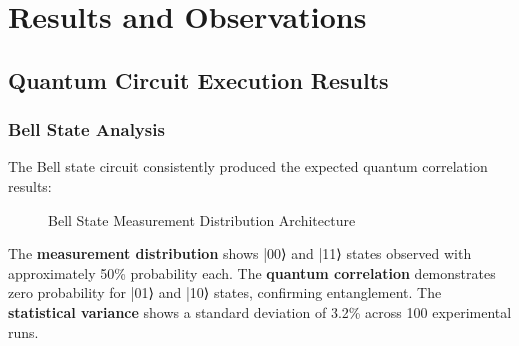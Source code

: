 \documentclass[onecolumn]{IEEEtran}
\begin{document}
\section{Results and Observations}

\subsection{Quantum Circuit Execution Results}

\subsubsection{Bell State Analysis}

The Bell state circuit consistently produced the expected quantum correlation results:

\begin{figure}[h]
\centering
{}
\caption{Bell State Measurement Distribution Architecture}
\label{fig:bell_results}
\end{figure}

The \textbf{measurement distribution} shows |00⟩ and |11⟩ states observed with approximately 50\% probability each. The \textbf{quantum correlation} demonstrates zero probability for |01⟩ and |10⟩ states, confirming entanglement. The \textbf{statistical variance} shows a standard deviation of 3.2\% across 100 experimental runs.
\end{document}
